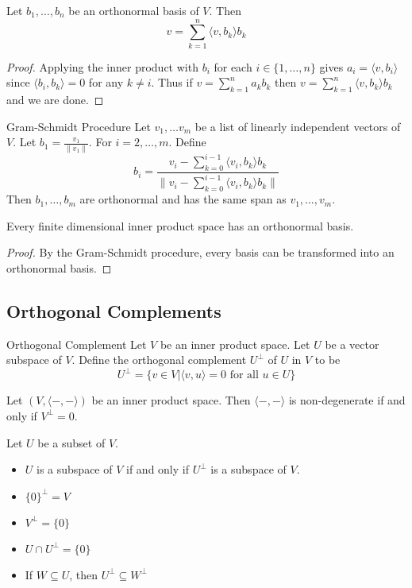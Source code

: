 \documentclass[a4paper]{article}
\begin{document}
\begin{prp}{}{} Let $b_1,\dots,b_n$ be an orthonormal basis of $V$. Then $$v=\sum_{k=1}^n\langle v,b_k\rangle b_k$$ \tcbline
\begin{proof}
Applying the inner product with $b_i$ for each $i\in\{1,\dots,n\}$ gives $a_i=\langle v,b_i\rangle$ since $\langle b_i,b_k\rangle=0$ for any $k\neq i$. Thus if $v=\sum_{k=1}^na_kb_k$ then $v=\sum_{k=1}^n\langle v,b_k\rangle b_k$ and we are done. 
\end{proof}
\end{prp}

\begin{thm}{Gram-Schmidt Procedure}{} Let $v_1,\dots v_m$ be a list of linearly independent vectors of $V$. Let $b_1=\frac{v_1}{\|v_1\|}$. For $i=2,\dots,m$. Define $$b_i=\frac{v_i-\sum_{k=0}^{i-1}\langle v_i,b_k\rangle b_k}{\|v_i-\sum_{k=0}^{i-1}\langle v_i,b_k\rangle b_k\|}$$ Then $b_1,\dots,b_m$ are orthonormal and has the same span as $v_1,\dots,v_m$. 
\end{thm}

\begin{thm}{}{} Every finite dimensional inner product space has an orthonormal basis. \tcbline
\begin{proof}
By the Gram-Schmidt procedure, every basis can be transformed into an orthonormal basis. 
\end{proof}
\end{thm}

\subsection{Orthogonal Complements}
\begin{defn}{Orthogonal Complement}{} Let $V$ be an inner product space. Let $U$ be a vector subspace of $V$. Define the orthogonal complement $U^\perp$ of $U$ in $V$ to be $$U^{\perp}=\{v\in V|\langle v,u\rangle=0\text{ for all }u\in U\}$$
\end{defn}

\begin{lmm}{}{} Let $(V,\langle-,-\rangle)$ be an inner product space. Then $\langle-,-\rangle$ is non-degenerate if and only if $V^\perp=0$. 
\end{lmm}

\begin{prp}{}{} Let $U$ be a subset of $V$. 
\begin{itemize}
\item $U$ is a subspace of $V$ if and only if $U^\perp$ is a subspace of $V$. 
\item $\{0\}^\perp=V$
\item $V^\perp=\{0\}$
\item $U\cap U^\perp=\{0\}$
\item If $W\subseteq U$, then $U^\perp\subseteq W^\perp$
\end{itemize}
\end{prp}
\end{document}
